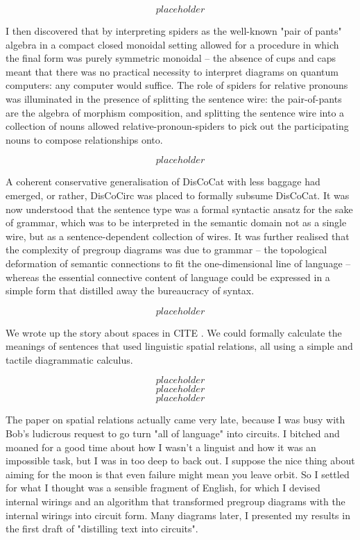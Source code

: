 \begin{fullwidth}
\[placeholder\]

I then discovered that by interpreting spiders as the well-known "pair of pants" algebra in a compact closed monoidal setting allowed for a procedure in which the final form was purely symmetric monoidal -- the absence of cups and caps meant that there was no practical necessity to interpret diagrams on quantum computers: any computer would suffice. The role of spiders for relative pronouns was illuminated in the presence of splitting the sentence wire: the pair-of-pants are the algebra of morphism composition, and splitting the sentence wire into a collection of nouns allowed relative-pronoun-spiders to pick out the participating nouns to compose relationships onto.

\[placeholder\]

A coherent conservative generalisation of DisCoCat with less baggage had emerged, or rather, DisCoCirc was placed to formally subsume DisCoCat. It was now understood that the sentence type was a formal syntactic ansatz for the sake of grammar, which was to be interpreted in the semantic domain not as a single wire, but as a sentence-dependent collection of wires. It was further realised that the complexity of pregroup diagrams was due to grammar -- the topological deformation of semantic connections to fit the one-dimensional line of language -- whereas the essential connective content of language could be expressed in a simple form that distilled away the bureaucracy of syntax.

\[placeholder\]

We wrote up the story about spaces in \bR CITE \e. We could formally calculate the meanings of sentences that used linguistic spatial relations, all using a simple and tactile diagrammatic calculus.

\[placeholder\]
\[placeholder\]
\[placeholder\]

The paper on spatial relations actually came very late, because I was busy with Bob's ludicrous request to go turn "all of language" into circuits. I bitched and moaned for a good time about how I wasn't a linguist and how it was an impossible task, but I was in too deep to back out. I suppose the nice thing about aiming for the moon is that even failure might mean you leave orbit. So I settled for what I thought was a sensible fragment of English, for which I devised internal wirings and an algorithm that transformed pregroup diagrams with the internal wirings into circuit form. Many diagrams later, I presented my results in the first draft of "distilling text into circuits".


\end{fullwidth}
